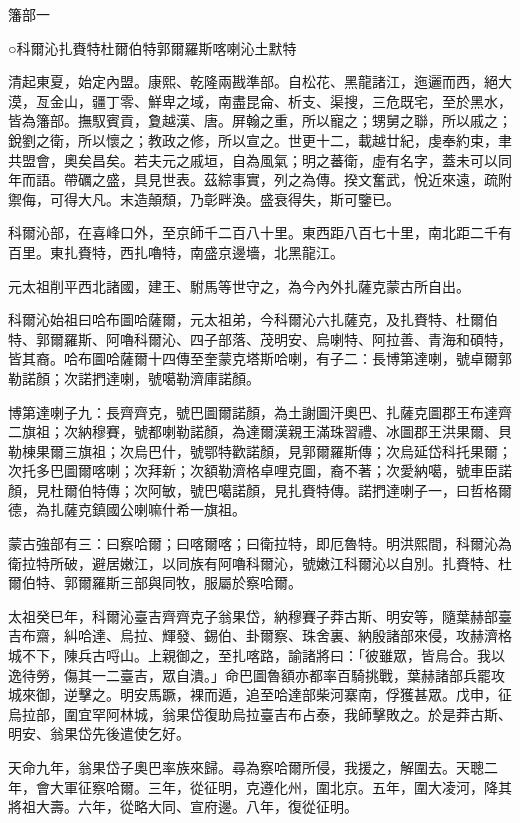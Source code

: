
\begin{pinyinscope}
籓部一

○科爾沁扎賚特杜爾伯特郭爾羅斯喀喇沁土默特

清起東夏，始定內盟。康熙、乾隆兩戡準部。自松花、黑龍諸江，迤邐而西，絕大漠，亙金山，疆丁零、鮮卑之域，南盡昆侖、析支、渠搜，三危既宅，至於黑水，皆為籓部。撫馭賓貢，夐越漢、唐。屏翰之重，所以寵之；甥舅之聯，所以戚之；銳劉之衛，所以懷之；教政之修，所以宣之。世更十二，載越廿紀，虔奉約束，聿共盟會，奧矣昌矣。若夫元之戚垣，自為風氣；明之蕃衛，虛有名字，蓋未可以同年而語。帶礪之盛，具見世表。茲綜事實，列之為傳。揆文奮武，悅近來遠，疏附禦侮，可得大凡。末造顛頹，乃彰畔渙。盛衰得失，斯可鑒已。

科爾沁部，在喜峰口外，至京師千二百八十里。東西距八百七十里，南北距二千有百里。東扎賚特，西扎嚕特，南盛京邊墻，北黑龍江。

元太祖削平西北諸國，建王、駙馬等世守之，為今內外扎薩克蒙古所自出。

科爾沁始祖曰哈布圖哈薩爾，元太祖弟，今科爾沁六扎薩克，及扎賚特、杜爾伯特、郭爾羅斯、阿嚕科爾沁、四子部落、茂明安、烏喇特、阿拉善、青海和碩特，皆其裔。哈布圖哈薩爾十四傳至奎蒙克塔斯哈喇，有子二：長博第達喇，號卓爾郭勒諾顏；次諾捫達喇，號噶勒濟庫諾顏。

博第達喇子九：長齊齊克，號巴圖爾諾顏，為土謝圖汗奧巴、扎薩克圖郡王布達齊二旗祖；次納穆賽，號都喇勒諾顏，為達爾漢親王滿珠習禮、冰圖郡王洪果爾、貝勒棟果爾三旗祖；次烏巴什，號鄂特歡諾顏，見郭爾羅斯傳；次烏延岱科托果爾；次托多巴圖爾喀喇；次拜新；次額勒濟格卓哩克圖，裔不著；次愛納噶，號車臣諾顏，見杜爾伯特傳；次阿敏，號巴噶諾顏，見扎賚特傳。諾捫達喇子一，曰哲格爾德，為扎薩克鎮國公喇嘛什希一旗祖。

蒙古強部有三：曰察哈爾；曰喀爾喀；曰衛拉特，即厄魯特。明洪熙間，科爾沁為衛拉特所破，避居嫩江，以同族有阿嚕科爾沁，號嫩江科爾沁以自別。扎賚特、杜爾伯特、郭爾羅斯三部與同牧，服屬於察哈爾。

太祖癸巳年，科爾沁臺吉齊齊克子翁果岱，納穆賽子莽古斯、明安等，隨葉赫部臺吉布齋，糾哈達、烏拉、輝發、錫伯、卦爾察、珠舍裏、納殷諸部來侵，攻赫濟格城不下，陳兵古哷山。上親御之，至扎喀路，諭諸將曰：「彼雖眾，皆烏合。我以逸待勞，傷其一二臺吉，眾自潰。」命巴圖魯額亦都率百騎挑戰，葉赫諸部兵罷攻城來御，逆擊之。明安馬蹶，裸而遁，追至哈達部柴河寨南，俘獲甚眾。戊申，征烏拉部，圍宜罕阿林城，翁果岱復助烏拉臺吉布占泰，我師擊敗之。於是莽古斯、明安、翁果岱先後遣使乞好。

天命九年，翁果岱子奧巴率族來歸。尋為察哈爾所侵，我援之，解圍去。天聰二年，會大軍征察哈爾。三年，從征明，克遵化州，圍北京。五年，圍大凌河，降其將祖大壽。六年，從略大同、宣府邊。八年，復從征明。


\end{pinyinscope}
